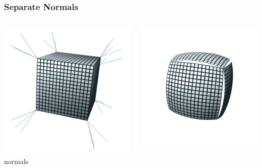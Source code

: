 \begin{frame}\frametitle{Separate Normals}
	\begin{columns}
		\begin{column}{0.4\textwidth}
		\begin{center}
				\includegraphics[width=\textwidth]{img/2_mesh/cracksNormals.png}
				\small{normals}
			\end{center}	
		\end{column}
		\begin{column}{0.4\textwidth}
		\begin{center}
				\includegraphics[width=\textwidth]{img/2_mesh/cracks.png}

\end{center}
\end{column}
\end{columns}
\end{frame}
